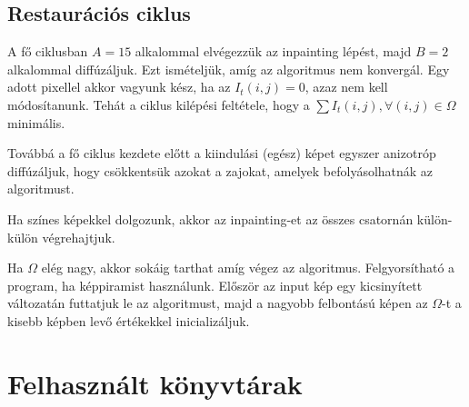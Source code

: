 \documentclass[10pt, draft]{article}
\begin{document}
\subsection{Restaurációs ciklus}
A fő ciklusban $A=15$ alkalommal elvégezzük az inpainting lépést, majd $B=2$ alkalommal diffúzáljuk.
Ezt ismételjük, amíg az algoritmus nem konvergál.
Egy adott pixellel akkor vagyunk kész, ha az $I_t(i, j) = 0$, azaz nem kell módosítanunk.
Tehát a ciklus kilépési feltétele, hogy a $\sum I_t(i, j), \forall (i, j) \in \Omega$ minimális.

Továbbá a fő ciklus kezdete előtt a kiindulási (egész) képet egyszer anizotróp diffúzáljuk,
hogy csökkentsük azokat a zajokat, amelyek befolyásolhatnák az algoritmust. 

Ha színes képekkel dolgozunk, akkor az inpainting-et az összes csatornán külön-külön végrehajtjuk.

Ha $\Omega$ elég nagy, akkor sokáig tarthat amíg végez az algoritmus.
Felgyorsítható a program, ha képpiramist használunk.
Először az input kép egy kicsinyített változatán futtatjuk le az algoritmust,
majd a nagyobb felbontású képen az $\Omega$-t a kisebb képben levő értékekkel inicializáljuk.

\section{Felhasznált könyvtárak}

\printbibliography
\end{document}
